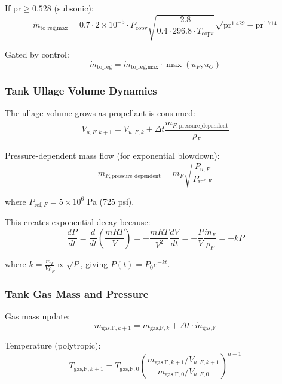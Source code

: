 \documentclass[11pt,a4paper]{article}
\begin{document}
If $\text{pr} \geq 0.528$ (subsonic):
\begin{equation}
\dot{m}_{\text{to\_reg},\text{max}} = 0.7 \cdot 2 \times 10^{-5} \cdot P_{\text{copv}} \sqrt{\frac{2.8}{0.4 \cdot 296.8 \cdot T_{\text{copv}}}} \sqrt{\text{pr}^{1.429} - \text{pr}^{1.714}}
\end{equation}

Gated by control:
\begin{equation}
\dot{m}_{\text{to\_reg}} = \dot{m}_{\text{to\_reg},\text{max}} \cdot \max(u_F, u_O)
\end{equation}

\subsubsection{Tank Ullage Volume Dynamics}

The ullage volume grows as propellant is consumed:
\begin{equation}
V_{u,F,k+1} = V_{u,F,k} + \Delta t \frac{\dot{m}_{F,\text{pressure\_dependent}}}{\rho_F}
\end{equation}

Pressure-dependent mass flow (for exponential blowdown):
\begin{equation}
\dot{m}_{F,\text{pressure\_dependent}} = \dot{m}_F \sqrt{\frac{P_{u,F}}{P_{\text{ref},F}}}
\end{equation}

where $P_{\text{ref},F} = 5 \times 10^6$ Pa (725 psi).

This creates exponential decay because:
\begin{equation}
\frac{dP}{dt} = \frac{d}{dt}\left(\frac{mRT}{V}\right) = -\frac{mRT}{V^2} \frac{dV}{dt} = -\frac{P}{V} \frac{\dot{m}_F}{\rho_F} = -k P
\end{equation}

where $k = \frac{\dot{m}_F}{V \rho_F} \propto \sqrt{P}$, giving $P(t) = P_0 e^{-k t}$.

\subsubsection{Tank Gas Mass and Pressure}

Gas mass update:
\begin{equation}
m_{\text{gas,F},k+1} = m_{\text{gas,F},k} + \Delta t \cdot \dot{m}_{\text{gas,F}}
\end{equation}

Temperature (polytropic):
\begin{equation}
T_{\text{gas,F},k+1} = T_{\text{gas,F},0} \left(\frac{m_{\text{gas,F},k+1}/V_{u,F,k+1}}{m_{\text{gas,F},0}/V_{u,F,0}}\right)^{n-1}
\end{equation}
\end{document}
